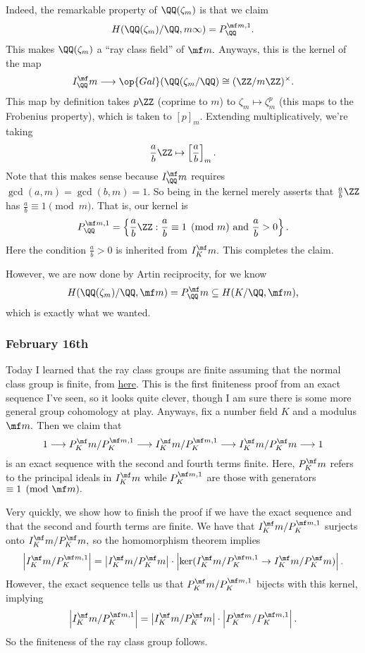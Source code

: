 Indeed, the remarkable property of $\QQ(\zeta_m)$ is that we claim
\[H(\QQ(\zeta_m)/\QQ,m\infty)=P_\QQ^{\mf m,1}.\]
This makes $\QQ(\zeta_m)$ a ``ray class field'' of $\mf m.$ Anyways, this is the kernel of the map
\[I_\QQ^\mf m\longrightarrow\op{Gal}(\QQ(\zeta_m/\QQ)\cong(\ZZ/m\ZZ)^\times.\]
This map by definition takes $p\ZZ$ (coprime to $m$) to $\zeta_m\mapsto\zeta_m^p$ (this maps to the Frobenius property), which is taken to $[p]_m.$ Extending multiplicatively, we're taking
\[\frac ab\ZZ\mapsto\left[\frac ab\right]_m.\]
Note that this makes sense because $I_\QQ^\mf m$ requires $\gcd(a,m)=\gcd(b,m)=1.$ So being in the kernel merely asserts that $\frac ab\ZZ$ has $\frac ab\equiv1\pmod m.$ That is, our kernel is
\[P_\QQ^{\mf m,1}=\left\{\frac ab\ZZ:\frac ab\equiv1\pmod m\text{ and }\frac ab>0\right\}.\]
Here the condition $\frac ab>0$ is inherited from $I_K^\mf m.$ This completes the claim.

However, we are now done by Artin reciprocity, for we know
\[H(\QQ(\zeta_m)/\QQ,\mf m)=P_\QQ^\mf m\subseteq H(K/\QQ,\mf m),\]
which is exactly what we wanted.

\subsubsection{February 16th}
Today I learned that the ray class groups are finite assuming that the normal class group is finite, from \href{https://math.stackexchange.com/questions/74206/ray-class-group}{here}. This is the first finiteness proof from an exact sequence I've seen, so it looks quite clever, though I am sure there is some more general group cohomology at play. Anyways, fix a number field $K$ and a modulus $\mf m.$ Then we claim that
\[1\longrightarrow P_K^\mf m/P_K^{\mf m,1}\longrightarrow I_K^\mf m/P_K^{\mf m,1}\longrightarrow I_K^\mf m/P_K^\mf m\longrightarrow1\]
is an exact sequence with the second and fourth terms finite. Here, $P_K^\mf m$ refers to the principal ideals in $I_K^\mf m$ while $P_K^{\mf m,1}$ are those with generators $\equiv1\pmod{\mf m}.$

Very quickly, we show how to finish the proof if we have the exact sequence and that the second and fourth terms are finite. We have that $I_K^\mf m/P_K^{\mf m,1}$ surjects onto $I_K^\mf m/P_K^\mf m,$ so the homomorphism theorem implies
\[\left|I_K^\mf m/P_K^{\mf m,1}\right|=\left|I_K^\mf m/P_K^\mf m\right|\cdot\left|\ker(I_K^\mf m/P_K^{\mf m,1}\to I_K^\mf m/P_K^\mf m)\right|.\]
However, the exact sequence tells us that $P_K^\mf m/P_K^{\mf m,1}$ bijects with this kernel, implying
\[\left|I_K^\mf m/P_K^{\mf m,1}\right|=\left|I_K^\mf m/P_K^\mf m\right|\cdot\left|P_K^{\mf m}/P_K^{\mf m,1}\right|.\]
So the finiteness of the ray class group follows.

